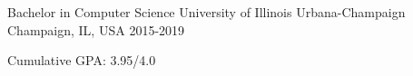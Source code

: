 
\begin{cventries}

\cventry
{Bachelor in Computer Science}
{University of Illinois Urbana-Champaign}
{Champaign, IL, USA}
{2015-2019}
{
\begin{cvitems}
\item {Cumulative GPA: 3.95/4.0}
\end{cvitems}
}

\end{cventries}
